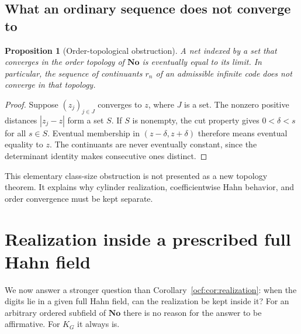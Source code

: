\documentclass[11pt,a4paper]{article}
\numberwithin{equation}{section}
\newtheorem{proposition}[theorem]{Proposition}
\theoremstyle{definition}
\theoremstyle{remark}
\newcommand{\No}{\mathbf{No}}
\begin{document}
\subsection{What an ordinary sequence does not converge to}

\begin{proposition}[Order-topological obstruction]\label{ocf:prop:topology}
A net indexed by a set that converges in the order topology of $\No$ is
eventually equal to its limit. In particular, the sequence of continuants
$r_n$ of an admissible infinite code does not converge in that topology.
\end{proposition}
\begin{proof}
Suppose $(z_j)_{j\in J}$ converges to $z$, where $J$ is a set. The nonzero
positive distances $|z_j-z|$ form a set $S$. If $S$ is nonempty, the cut
property gives $0<\delta<s$ for all $s\in S$. Eventual membership in
$(z-\delta,z+\delta)$ therefore means eventual equality to $z$. The
continuants are never eventually constant, since the determinant identity
makes consecutive ones distinct.
\end{proof}

This elementary class-size obstruction is not presented as a new topology
theorem. It explains why cylinder realization, coefficientwise Hahn
behavior, and order convergence must be kept separate.

\section{Realization inside a prescribed full Hahn field}
\label{ocf:sec:hahn}

We now answer a stronger question than Corollary~\ref{ocf:cor:realization}:
when the digits lie in a given full Hahn field, can the realization be kept
inside it? For an arbitrary ordered subfield of $\No$ there is no reason
for the answer to be affirmative. For $K_G$ it always is.
\end{document}
